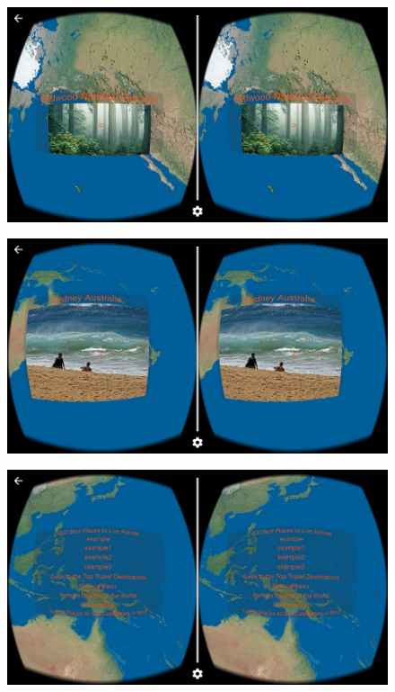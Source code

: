 \begin{figure}[H]
	\centering
	\includegraphics[width=\linewidth, keepaspectratio]{Figures/Screenshots/device-2016-10-28-012721.jpg}
	\decoRule
\end{figure}

\begin{figure}[H]
	\centering
	\includegraphics[width=\linewidth, keepaspectratio]{Figures/Screenshots/device-2016-10-28-013208.jpg}
	\decoRule
\end{figure}

\begin{figure}[H]
	\centering
	\includegraphics[width=\linewidth, keepaspectratio]{Figures/Screenshots/device-2016-10-28-013605.jpg}
	\decoRule
\end{figure}

